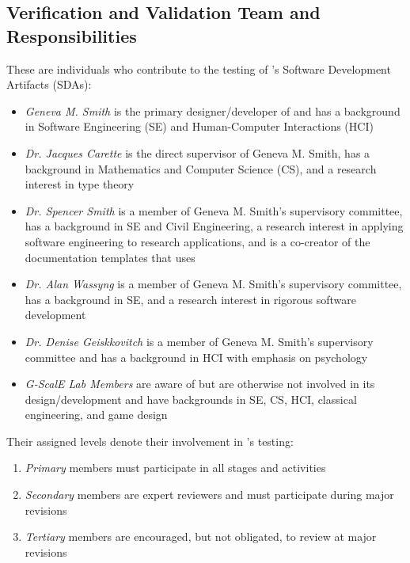 \subsection{Verification and Validation Team and Responsibilities}
These are individuals who contribute to the testing of \progname{}'s Software
Development Artifacts (SDAs):
\begin{itemize}

    \item \textit{Geneva M. Smith} is the primary designer/developer of
    \progname{} and has a background in Software Engineering (SE) and
    Human-Computer Interactions (HCI)

    \item \textit{Dr. Jacques Carette} is the direct supervisor of Geneva M.
    Smith, has a background in Mathematics and Computer Science (CS), and a
    research interest in type theory

    \item \textit{Dr. Spencer Smith} is a member of Geneva M. Smith's
    supervisory committee, has a background in SE and Civil Engineering, a
    research interest in applying software engineering to research
    applications, and is a co-creator of the documentation templates that
    \progname{} uses~\citep{smith2009document}

    \item \textit{Dr. Alan Wassyng} is a member of Geneva M. Smith's
    supervisory committee, has a background in SE, and a research interest in
    rigorous software development

    \item \textit{Dr. Denise Geiskkovitch} is a member of Geneva M. Smith's
    supervisory committee and has a background in HCI with emphasis on
    psychology

    \item \textit{G-ScalE Lab Members} are aware of \progname{} but are
    otherwise not involved in its design/develo\-pment and have backgrounds in
    SE, CS, HCI, classical engineering, and game design

\end{itemize}

\noindent Their assigned levels denote their involvement in \progname{}'s
testing:
\begin{enumerate}

    \item \textit{Primary} members must participate in all stages and activities

    \item \textit{Secondary} members are expert reviewers and must participate
    during major revisions

    \item \textit{Tertiary} members are encouraged, but not obligated, to
    review \progname{} at major revisions

\end{enumerate}

